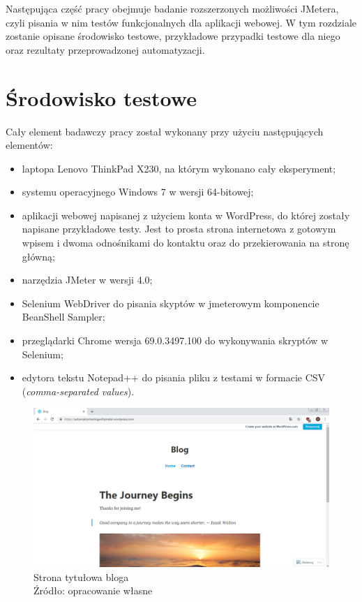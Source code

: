 Następująca część pracy obejmuje badanie rozszerzonych możliwości JMetera, czyli pisania w nim testów funkcjonalnych dla aplikacji webowej. W tym rozdziale zostanie opisane środowisko testowe, przykładowe przypadki testowe dla niego oraz rezultaty przeprowadzonej automatyzacji.

\section{Środowisko testowe}
\noindent Cały element badawczy pracy został wykonany przy użyciu następujących elementów:
\begin{itemize}
\item laptopa Lenovo ThinkPad X230, na którym wykonano cały eksperyment;
\item systemu operacyjnego Windows 7 w wersji 64-bitowej;
\item aplikacji webowej napisanej z użyciem konta w WordPress, do której zostały napisane przykładowe testy. Jest to prosta strona internetowa z gotowym wpisem i dwoma odnośnikami do kontaktu oraz do przekierowania na stronę główną; 
\item narzędzia JMeter w wersji 4.0;
\item Selenium WebDriver do pisania skyptów w jmeterowym komponencie BeanShell Sampler;
\item przeglądarki Chrome wersja 69.0.3497.100 do wykonywania skryptów w Selenium;
\item edytora tekstu Notepad++ do pisania pliku z testami w formacie CSV (\textit{comma-separated values}).
\end{itemize}

\begin{figure}[H]
\centering
\captionsetup{justification=centering}
\includegraphics[width=1\textwidth]{Blog.PNG}
\caption[Strona tytułowa bloga]{\label{fig:ham}Strona tytułowa bloga \\ Źródło: opracowanie własne}
\end{figure}


